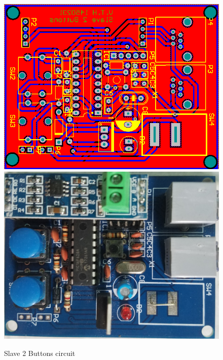 \begin{figure}[!htbp]
    \begin{center}
    \includegraphics[scale=0.6]{images/s2bLayout.png}\\

    \includegraphics[scale=0.15]{images/s2b.jpg}
    \caption{Slave 2 Buttons circuit}
    \label{fig:slave2ButtonsCircuit}
    \end{center}
\end{figure}
